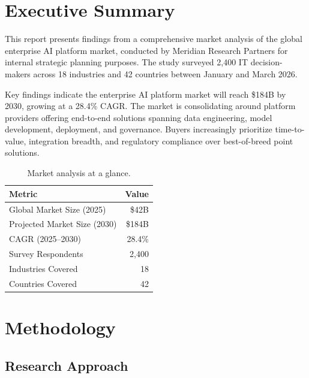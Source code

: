 \documentclass[
    language=english,
    doctype=market-analysis,
    institution=none,
]{../../omnilatex}
\begin{document}
\maketitle

\section*{Executive Summary}

This report presents findings from a comprehensive market analysis of the
global enterprise AI platform market, conducted by Meridian Research Partners
for internal strategic planning purposes. The study surveyed 2,400 IT
decision-makers across 18 industries and 42 countries between January and
March 2026.

Key findings indicate the enterprise AI platform market will reach \$184B by
2030, growing at a 28.4\% CAGR. The market is consolidating around platform
providers offering end-to-end solutions spanning data engineering, model
development, deployment, and governance. Buyers increasingly prioritize
time-to-value, integration breadth, and regulatory compliance over
best-of-breed point solutions.

\begin{table}[h]
    \centering
    \begin{tabular}{lr}
        \toprule
        \textbf{Metric} & \textbf{Value} \\
        \midrule
        Global Market Size (2025)    & \$42B    \\
        Projected Market Size (2030) & \$184B   \\
        CAGR (2025--2030)            & 28.4\%   \\
        Survey Respondents           & 2,400    \\
        Industries Covered           & 18       \\
        Countries Covered            & 42       \\
        \bottomrule
    \end{tabular}
    \caption{Market analysis at a glance.}
\end{table}

\section{Methodology}

\subsection{Research Approach}
\end{document}
